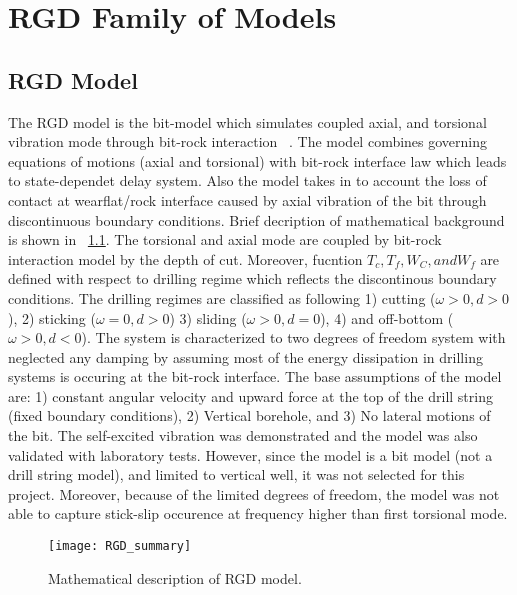 \chapter{RGD Family of Models}

\section{RGD Model}

The RGD model is the bit-model which simulates coupled axial, and torsional vibration mode through bit-rock interaction ~\cite{ref:richard2007a}. The model combines governing equations of motions (axial and torsional) with bit-rock interface law which leads to state-dependet delay system. Also the model takes in to account the loss of contact at wearflat/rock interface caused by axial vibration of the bit through discontinuous boundary conditions. Brief decription of mathematical background is shown in \figurename~\ref{figure_RGD_Summary}. The torsional and axial mode are coupled by bit-rock interaction model by the depth of cut. Moreover, fucntion $T_c, T_f, W_C, and W_f$ are defined with respect to drilling regime which reflects the discontinous boundary conditions. The drilling regimes are classified as following 1) cutting ($\omega>0, d>0$), 2) sticking ($\omega=0, d>0$) 3) sliding ($\omega>0, d=0$), 4) and off-bottom ($\omega>0, d<0$). The system is characterized to two degrees of freedom system with neglected any damping by assuming most of the energy dissipation in drilling systems is occuring at the bit-rock interface. The base assumptions of the model are: 1) constant angular velocity and upward force at the top of the drill string (fixed boundary conditions), 2) Vertical borehole, and 3) No lateral motions of the bit. The self-excited vibration was demonstrated and the model was also validated with laboratory tests. However, since the model is a bit model (not a drill string model), and limited to vertical well, it was not selected for this project. Moreover, because of the limited degrees of freedom, the model was not able to capture stick-slip occurence at frequency higher than first torsional mode. 

\begin{figure}[!hbt]
  \centering
  \texttt{[image: RGD\_summary]}
  \caption[Mathematical description of RGD model.]{Mathematical description of RGD model.}\label{figure_RGD_Summary}
\end{figure}

